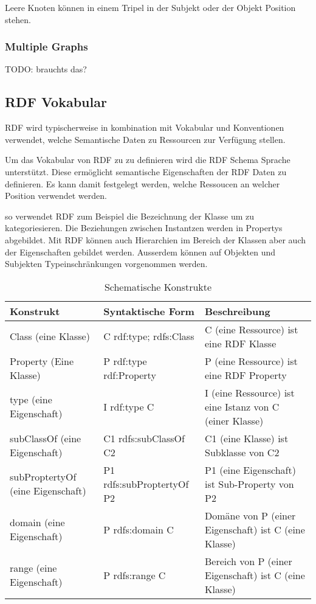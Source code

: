\noindent\hspace*{15mm} Leere Knoten können in einem Tripel in der Subjekt oder der Objekt Position stehen.


\subsubsection{Multiple Graphs}
\label{sec:owlRdf_rdf_dataModel_multipleGraphs}

TODO: brauchts das?

\subsection{RDF Vokabular}
\label{sec:owlRdf_rdf_voca}
RDF wird typischerweise in kombination mit Vokabular und Konventionen verwendet, welche Semantische Daten zu Ressourcen zur Verfügung stellen.

Um das Vokabular von RDF zu zu definieren wird die RDF Schema Sprache unterstützt. Diese ermöglicht semantische Eigenschaften der RDF Daten zu definieren. Es kann damit festgelegt werden, welche Ressoucen an welcher Position verwendet werden.

so verwendet RDF zum Beispiel die Bezeichnung der Klasse um zu kategoriesieren. Die Beziehungen zwischen Instantzen werden in Propertys abgebildet. Mit RDF können auch Hierarchien im Bereich der Klassen aber auch der Eigenschaften gebildet werden. Ausserdem können auf Objekten und Subjekten Typeinschränkungen vorgenommen werden.

\begin{center}
	\begin{table}[H]
	 \centering
		\caption{Schematische Konstrukte}	
			\begin{tabular}{|l|l|l|} \toprule
			\textbf{Konstrukt}  & \textbf{Syntaktische Form} & \textbf{Beschreibung} \\ \midrule
				Class (eine Klasse) & C rdf:type; rdfs:Class& C (eine Ressource) ist eine RDF Klasse \\  \midrule		
				Property (Eine Klasse) & P rdf:type rdf:Property & P (eine Ressource) ist eine RDF Property\\  \midrule		
				type (eine Eigenschaft) & I rdf:type C &I (eine Ressource) ist eine Istanz von C (einer Klasse)\\  \midrule
subClassOf (eine Eigenschaft) & C1 rdfs:subClassOf C2 & C1 (eine Klasse) ist Subklasse von C2 \\  \midrule
subProptertyOf (eine Eigenschaft) & P1 rdfs:subProptertyOf P2 & P1 (eine Eigenschaft) ist Sub-Property von P2 \\  \midrule
domain (eine Eigenschaft) & P rdfs:domain C & Domäne von P (einer Eigenschaft) ist C (eine Klasse) \\  \midrule			
range (eine Eigenschaft) & P rdfs:range C & Bereich von P (einer Eigenschaft) ist C (eine Klasse) \\  \bottomrule
			\end{tabular}
		\label{tab:SchematischeKonstrukte}
	\end{table}
\end{center}

